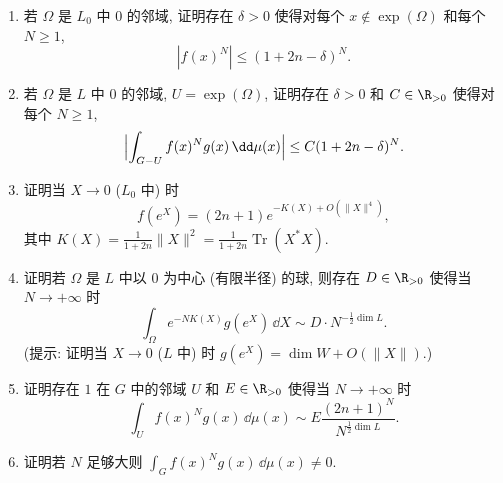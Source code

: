 \begin{exercise}
\begin{enumerate}
\item[(b)] 若 $\Omega$ 是 $L_0$ 中 $0$ 的邻域, 证明存在 $\delta > 0$ 使得对每个 $x \notin \exp(\Omega)$ 和每个 $N \geq 1$,
\[
|f(x)^N| \leq (1 + 2n - \delta)^N.
\]
\item[(c)] 若 $\Omega$ 是 $L$ 中 $0$ 的邻域, $U = \exp(\Omega)$, 证明存在 $\delta > 0$ 和 $C \in \R_{>0}$ 使得对每个 $N \geq 1$,
\[
\Bigl|\int_{G-U}f(x)^Ng(x)\,\dd\mu(x)\Bigr| \leq C(1 + 2n - \delta)^N.
\]
\item[(d)] 证明当 $X \to 0$ ($L_0$ 中) 时
\[
f(e^X) = (2n + 1)e^{-K(X) + O(\|X\|^4)},
\]
其中 $K(X) = \frac{1}{1+2n}\|X\|^2 = \frac{1}{1+2n}\operatorname{Tr}(X^*X)$.
\item[(e)] 证明若 $\Omega$ 是 $L$ 中以 $0$ 为中心 (有限半径) 的球, 则存在 $D \in \R_{>0}$ 使得当 $N \to +\infty$ 时
\[
\int_{\Omega}e^{-NK(X)}g(e^X)\,\dd X \sim D \cdot N^{-\frac{1}{2}\dim L}.
\]
(提示: 证明当 $X \to 0$ ($L$ 中) 时 $g(e^X) = \dim W + O(\|X\|)$.)
\item[(f)] 证明存在 $1$ 在 $G$ 中的邻域 $U$ 和 $E \in \R_{>0}$ 使得当 $N \to +\infty$ 时
\[
\int_U f(x)^Ng(x)\,\dd\mu(x) \sim E\frac{(2n + 1)^N}{N^{\frac{1}{2}\dim L}}.
\]
\item[(g)] 证明若 $N$ 足够大则 $\int_G f(x)^Ng(x)\,\dd\mu(x) \neq 0$.
\end{enumerate}
\end{exercise}

